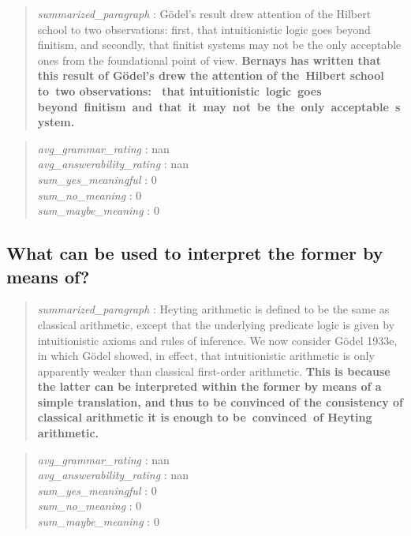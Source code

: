 \begin{quote}
\emph{summarized\_paragraph} : Gödel's result drew attention of the
Hilbert school to two observations: first, that intuitionistic logic
goes beyond finitism, and secondly, that finitist systems may not be the
only acceptable ones from the foundational point of view.
\textbf{Bernays has written that this result of Gödel's drew the
attention of the~Hilbert school to~two observations: ~that
intuitionistic~logic~goes
beyond~finitism~and~that~it~may~not~be~the~only~acceptable~system.}
\end{quote}

\begin{quote}
\emph{avg\_grammar\_rating} : nan\\
\emph{avg\_answerability\_rating} : nan\\
\emph{sum\_yes\_meaningful} : 0\\
\emph{sum\_no\_meaning} : 0\\
\emph{sum\_maybe\_meaning} : 0
\end{quote}

\hypertarget{what-can-be-used-to-interpret-the-former-by-means-of}{%
\subsection{What can be used to interpret the former by means
of?}\label{what-can-be-used-to-interpret-the-former-by-means-of}}

\begin{quote}
\emph{summarized\_paragraph} : Heyting arithmetic is defined to be the
same as classical arithmetic, except that the underlying predicate logic
is given by intuitionistic axioms and rules of inference. We now
consider Gödel 1933e, in which Gödel showed, in effect, that
intuitionistic arithmetic is only apparently weaker than classical
first-order arithmetic. \textbf{This is because the latter can be
interpreted within the former by means of a simple translation, and thus
to be convinced of the consistency of classical arithmetic it is enough
to be~convinced~of Heyting arithmetic.}
\end{quote}

\begin{quote}
\emph{avg\_grammar\_rating} : nan\\
\emph{avg\_answerability\_rating} : nan\\
\emph{sum\_yes\_meaningful} : 0\\
\emph{sum\_no\_meaning} : 0\\
\emph{sum\_maybe\_meaning} : 0
\end{quote}

